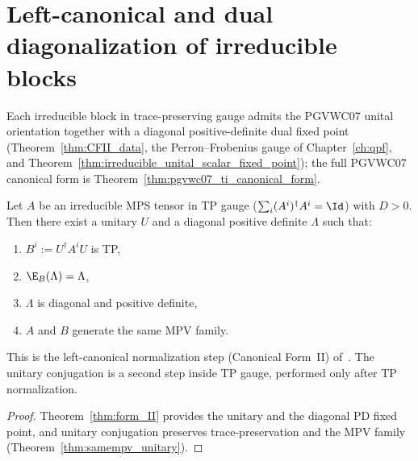 \section{Left-canonical and dual diagonalization of irreducible blocks}%
\label{sec:canonical_construction_1606}

Each irreducible block in trace-preserving gauge admits the PGVWC07 unital
orientation together with a diagonal positive-definite dual fixed point
(Theorem~\ref{thm:CFII_data}, the Perron--Frobenius gauge of
Chapter~\ref{ch:qpf}, and
Theorem~\ref{thm:irreducible_unital_scalar_fixed_point}); the full PGVWC07
canonical form is Theorem~\ref{thm:pgvwc07_ti_canonical_form}.

\begin{theorem}%
    \label{thm:CFII_data}
    \leanok
    Let $A$ be an irreducible MPS tensor in TP gauge
    ($\sum_i (A^i)^\dagger A^i = \Id$) with $D > 0$. Then there exist a unitary
    $U$ and a diagonal positive definite $\Lambda$ such that:
    \begin{enumerate}
        \item $B^i := U^\dagger A^i U$ is TP,
        \item $\E_B(\Lambda) = \Lambda$,
        \item $\Lambda$ is diagonal and positive definite,
        \item $A$ and $B$ generate the same MPV family.
    \end{enumerate}
    This is the left-canonical normalization step (Canonical Form~II)
    of~\cite[Appendix~A]{Cirac2016MPDO_arXiv}. The unitary conjugation is a
    second step inside TP gauge, performed only after TP normalization.
\end{theorem}

\begin{proof}\leanok
    Theorem~\ref{thm:form_II} provides the unitary and the diagonal PD fixed
    point, and unitary conjugation preserves trace-preservation and the MPV
    family (Theorem~\ref{thm:samempv_unitary}).
\end{proof}


